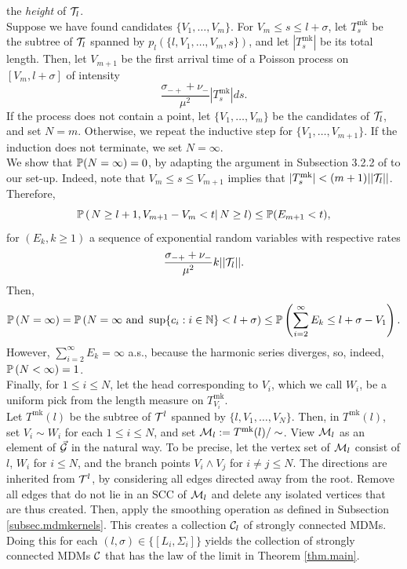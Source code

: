 the \emph{height} of $\cT_l$. \\
Suppose we have found candidates $\{V_1,\dots,V_m\}$. For $V_m\leq s\leq l+\sigma$, let $T^{\mathrm{mk}}_s$ be the subtree of $\cT_l$ spanned by $p_l\left(\{l,V_1,\dots,V_m,s\}\right)$, and let $|T^{\mathrm{mk}}_s|$ be its total length. Then, let $V_{m+1}$ be the first arrival time of a Poisson process on $[V_m,l+\sigma]$ of intensity $$\frac{\sigma_{-+}+\nu_-}{\mu^2}|T^{\mathrm{mk}}_s|ds.$$ If the process does not contain a point, let $\{V_1,\dots,V_m\}$ be the candidates of $\cT_l$, and set $N=m$. Otherwise, we repeat the inductive step for $\{V_1,\dots,V_{m+1}\}.$ If the induction does not terminate, we set $N=\infty$.\\
We show that $\P(N=\infty)=0$, by adapting the argument in Subsection 3.2.2 of \cite{goldschmidtScalingLimitCritical2019} to our set-up. Indeed, note that $V_m\leq s\leq V_{m+1}$ implies that  $|T^{\mathrm{mk}}_s|<(m+1)||\cT_l||$. Therefore, 
$$\P\left(\left.N\geq l+1,V_{m+1}-V_m<t \right|N\geq l\right)\leq \P(E_{m+1}<t),$$
for $(E_{k},k\geq 1)$ a sequence of exponential random variables with respective rates $$\frac{\sigma_{-+}+\nu_-}{\mu^2}k||\cT_l||.$$ 
Then,
$$\P\left(N=\infty \right)=\P\left(N=\infty\text{ and }\sup\{c_i:i\in \N\}<l+\sigma\right)\leq \P\left(\sum_{i=2}^\infty E_k\leq l+\sigma-V_1\right).$$
However, $\sum_{i=2}^\infty E_k=\infty$ a.s., because the harmonic series diverges, so, indeed, $\P\left(N<\infty \right)=1$. \\
Finally, for $1\leq i \leq N$, let the head corresponding to $V_i$, which we call $W_i$, be a uniform pick from the length measure on $T^{\mathrm{mk}}_{V_i}$. \\
Let $T^{\mathrm{mk}}(l)$ be the subtree of $\cT^{l}$ spanned by $\{l,V_1,\dots,V_N\}$. Then, in $T^{\mathrm{mk}}(l)$, set $V_i\sim W_i$ for each $1\leq i\leq N$, and set $\cM_{l}:=T^{\mathrm{mk}}(l)/\sim$. View $\cM_{l}$ as an element of $\vec{\cG}$ in the natural way. To be precise,  let the vertex set of $\cM_l$ consist of $l$, $W_i$ for $i\leq N$, and the branch points $V_i\wedge V_j$ for $i\neq j\leq N$. The directions are inherited from $\cT^l$, by considering all edges directed away from the root. Remove all edges that do not lie in an SCC of $\cM_{l}$ and delete any isolated vertices that are thus created. Then, apply the smoothing operation as defined in Subsection \ref{subsec.mdmkernels}. This creates a collection $\cC_l$ of strongly connected MDMs. Doing this for each $(l,\sigma)\in \{[L_i,\Sigma_i]\}$ yields the collection of strongly connected MDMs $\cC$ that has the law of the limit in Theorem \ref{thm.main}.

